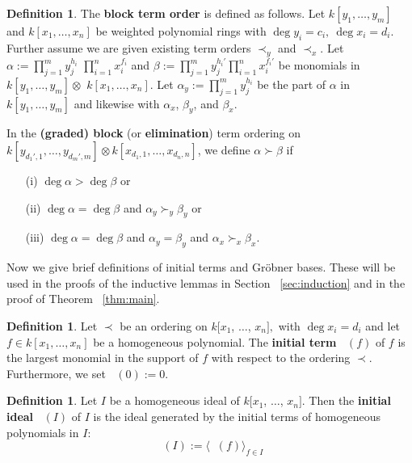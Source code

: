 \documentclass{amsart}
\theoremstyle{plain}
\theoremstyle{definition}
\newtheorem{defn}[thm]{Definition}
\theoremstyle{remark}
\numberwithin{equation}{section}
\DeclareMathOperator{\initial}{in_\prec}
\begin{document}
\begin{defn}
\label{defn:block-order}
The \textbf{block term order} is defined as follows. Let $k[y_{1}, \ldots, y_{m}]$ and $k[x_{1}, \ldots,
x_{n}]$ be weighted polynomial rings with $\deg y_i = c_i,\: \deg x_i = d_i.$ Further assume we are given existing term
orders $\prec_y$ and $\prec_x$. Let $\alpha :=
\prod_{j = 1}^{m} y_{j}^{h_i}$ $\prod_{i = 1}^{n} x_{i}
^{f_i}$ and $\beta := \prod_{j = 1}^{m} y_{j}^{h_i'}
\prod_{i = 1}^{n} x_{i}^{f_i'}$ be monomials in $k[y_{1},
\ldots, y_{m}] \otimes$ $k[x_{1}, \ldots, x_{n}]$.
Let $\alpha_y := \prod_{j = 1}^{m} y_{j}^{h_i}$ be the
part of $\alpha$ in $k[y_{1}, \ldots, y_{m}]$ and
likewise with $\alpha_x$, $\beta_y$, and $\beta_x$.

In the \textbf{(graded) block} (or \textbf{elimination}) term
ordering on $k[y_{d_1', 1}, \ldots, y_{d_m', m}] \otimes k[x_{d_1, 1},
\ldots, x_{d_n, n}]$, we define $\alpha \succ \beta$ if
  \begin{enumerate}
	\item[(i)] $\deg \alpha  > \deg \beta$ or
  \item[(ii)] $\deg \alpha = \deg \beta$ and $\alpha_y \succ_y \beta_y$ or
	\item[(iii)] $\deg \alpha = \deg \beta$ and $\alpha_y = \beta_y$ and $\alpha_x \succ_x \beta_x$.
  \end{enumerate}
\end{defn}

Now we give brief definitions of initial terms and Gr\"{o}bner
bases. These will be used in the proofs of the inductive lemmas
in Section ~\ref{sec:induction} and in the proof of Theorem
~\ref{thm:main}.

\begin{defn}
\label{defn:initial-term}
Let $\prec$ be an ordering on $k[x_{1}$, $\ldots$, $x_{n}],$ with $\deg x_i = d_i$ and let $f \in k[x_{1}, \ldots, x_{n}]$ be a homogeneous
polynomial. The \textbf{initial term} $\initial(f)$ of $f$
is the largest monomial in the support of $f$ with respect to
the ordering $\prec$. Furthermore, we set $\initial(0) := 0$.
\end{defn}


\begin{defn}
\label{defn:initial-ideal}
Let $I$ be a homogeneous ideal of $k[x_{1}$, $\ldots$,
$x_{n}]$. Then the {\bf initial ideal} $\initial(I)$ of $I$ is
the ideal generated by the initial terms of homogeneous polynomials
in $I$:
\[
	\initial(I) := \langle \initial(f) \rangle_{f \in I}
\]
\end{defn}
\end{document}
